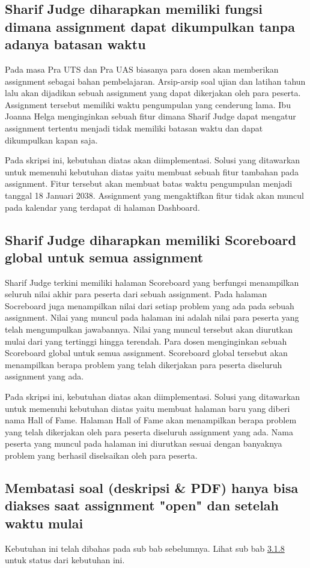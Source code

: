 \subsection{Sharif Judge diharapkan memiliki fungsi dimana assignment dapat dikumpulkan tanpa adanya batasan waktu}
Pada masa Pra UTS dan Pra UAS biasanya para dosen akan memberikan assignment sebagai bahan pembelajaran. Arsip-arsip soal ujian dan latihan tahun lalu akan dijadikan sebuah assignment yang dapat dikerjakan oleh para peserta. Assignment tersebut memiliki waktu pengumpulan yang cenderung lama. Ibu Joanna Helga menginginkan sebuah fitur dimana Sharif Judge dapat mengatur assignment tertentu menjadi tidak memiliki batasan waktu dan dapat dikumpulkan kapan saja. 

Pada skripsi ini, kebutuhan diatas akan diimplementasi. Solusi yang ditawarkan untuk memenuhi kebutuhan diatas yaitu membuat sebuah fitur tambahan pada assignment. Fitur tersebut akan membuat batas waktu pengumpulan menjadi tanggal 18 Januari 2038. Assignment yang mengaktifkan fitur tidak akan muncul pada kalendar yang terdapat di halaman Dashboard.

\subsection{Sharif Judge diharapkan memiliki Scoreboard global untuk semua assignment}
Sharif Judge terkini memiliki halaman Scoreboard yang berfungsi menampilkan seluruh nilai akhir para peserta dari sebuah assignment. Pada halaman Socreboard juga menampilkan nilai dari setiap problem yang ada pada sebuah assignment. Nilai yang muncul pada halaman ini adalah nilai para peserta yang telah mengumpulkan jawabannya. Nilai yang muncul tersebut akan diurutkan mulai dari yang tertinggi hingga terendah. Para dosen menginginkan sebuah Scoreboard global untuk semua assignment. Scoreboard global tersebut akan menampilkan berapa problem yang telah dikerjakan para peserta diseluruh assignment yang ada. 

Pada skripsi ini, kebutuhan diatas akan diimplementasi. Solusi yang ditawarkan untuk memenuhi kebutuhan diatas yaitu membuat halaman baru yang diberi nama Hall of Fame. Halaman Hall of Fame akan menampilkan berapa problem yang telah dikerjakan oleh para peserta diseluruh assignment yang ada. Nama peserta yang muncul pada halaman ini diurutkan sesuai dengan banyaknya problem yang berhasil diselsaikan oleh para peserta.

\subsection{Membatasi soal (deskripsi \& PDF) hanya bisa diakses saat assignment "open" dan setelah waktu mulai}
Kebutuhan ini telah dibahas pada sub bab sebelumnya. Lihat sub bab \hyperref[subsec:membatasisoal]{3.1.8} untuk status dari kebutuhan ini.

